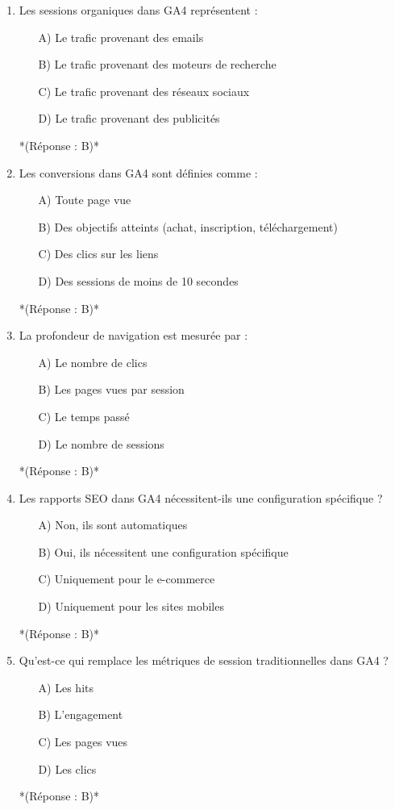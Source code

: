 \documentclass[12pt,a4paper,twoside]{report}
\begin{document}
\begin{enumerate}
    \item Les sessions organiques dans GA4 représentent :
    \begin{itemize}
        \item[A)] Le trafic provenant des emails
        \item[B)] Le trafic provenant des moteurs de recherche
        \item[C)] Le trafic provenant des réseaux sociaux
        \item[D)] Le trafic provenant des publicités
    \end{itemize}
    *(Réponse : B)*

    \item Les conversions dans GA4 sont définies comme :
    \begin{itemize}
        \item[A)] Toute page vue
        \item[B)] Des objectifs atteints (achat, inscription, téléchargement)
        \item[C)] Des clics sur les liens
        \item[D)] Des sessions de moins de 10 secondes
    \end{itemize}
    *(Réponse : B)*

    \item La profondeur de navigation est mesurée par :
    \begin{itemize}
        \item[A)] Le nombre de clics
        \item[B)] Les pages vues par session
        \item[C)] Le temps passé
        \item[D)] Le nombre de sessions
    \end{itemize}
    *(Réponse : B)*

    \item Les rapports SEO dans GA4 nécessitent-ils une configuration spécifique ?
    \begin{itemize}
        \item[A)] Non, ils sont automatiques
        \item[B)] Oui, ils nécessitent une configuration spécifique
        \item[C)] Uniquement pour le e-commerce
        \item[D)] Uniquement pour les sites mobiles
    \end{itemize}
    *(Réponse : B)*

    \item Qu'est-ce qui remplace les métriques de session traditionnelles dans GA4 ?
    \begin{itemize}
        \item[A)] Les hits
        \item[B)] L'engagement
        \item[C)] Les pages vues
        \item[D)] Les clics
    \end{itemize}
    *(Réponse : B)*


\end{enumerate}
\end{document}
